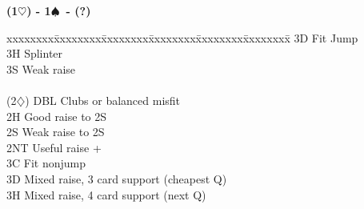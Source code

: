 \documentclass[10pt]{article}
\renewcommand{\d}{$\diamondsuit$}
\newcommand{\h}{$\heartsuit$}
\newcommand{\s}{$\spadesuit$}
\newenvironment{bidtable}[1][]
{\textbf{#1}
  \begin{adjustwidth}{1em}{}
    \addvspace{2pt}
    \begin{tabbing}
      xxxxxxxx\=xxxxxxxx\=xxxxxxxx\=xxxxxxxx\=xxxxxxxx\=xxxxxxxx\=\kill}
{\end{tabbing}\end{adjustwidth}\bigskip}%
\begin{document}
\begin{multicols*}{2}
\begin{bidtable}[(1\h) - 1\s\ - (?)]
      \> 3D     \> Fit Jump                                                 \\
      \> 3H     \> Splinter                                                 \\
      \> 3S     \> Weak raise                                               \\
                                                                            \\
(2\d) \> DBL    \> Clubs or balanced misfit                                 \\
      \> 2H     \> Good raise to 2S                                         \\
      \> 2S     \> Weak raise to 2S                                         \\
      \> 2NT    \> Useful raise +                                           \\
      \> 3C     \> Fit nonjump                                              \\
      \> 3D     \> Mixed raise, 3 card support (cheapest Q)                 \\
      \> 3H     \> Mixed raise, 4 card support (next Q)
\end{bidtable}


\end{multicols*}
\end{document}
